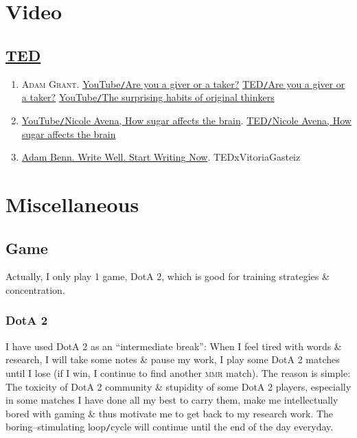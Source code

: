 \documentclass{article}
\begin{document}
\section{Video}

\subsection{\href{https://www.ted.com/}{TED}}

\begin{enumerate}
	\item \textsc{Adam Grant.} \href{https://www.youtube.com/watch?v=YyXRYgjQXX0}{YouTube\texttt{/}Are you a giver or a taker?} \href{https://www.ted.com/talks/adam_grant_are_you_a_giver_or_a_taker}{TED\texttt{/}Are you a giver or a taker?} \href{https://www.youtube.com/watch?v=fxbCHn6gE3U}{YouTube\texttt{/}The surprising habits of original thinkers}
	\item \href{https://www.youtube.com/watch?v=lEXBxijQREo}{YouTube\texttt{/}Nicole Avena, How sugar affects the brain}. \href{https://ed.ted.com/lessons/how-sugar-affects-the-brain-nicole-avena}{TED\texttt{/}Nicole Avena, How sugar affects the brain}
	\item \href{https://www.youtube.com/watch?v=KUKgJsvoDUk}{Adam Benn. Write Well. Start Writing Now}. TEDxVitoriaGasteiz
\end{enumerate}


\section{Miscellaneous}

\subsection{Game}
Actually, I only play 1 game, DotA 2, which is good for training strategies \& concentration.

\subsubsection{DotA 2}
I have used DotA 2 as an ``intermediate break'': When I feel tired with words \& research, I will take some notes \& pause my work, I play some DotA 2 matches until I lose (if I win, I continue to find another \textsc{mmr} match). The reason is simple: The toxicity of DotA 2 community \& stupidity of some DotA 2 players, especially in some matches I have done all my best to carry them, make me intellectually bored with gaming \& thus motivate me to get back to my research work. The boring--stimulating loop\texttt{/}cycle will continue until the end of the day everyday.
\end{document}
